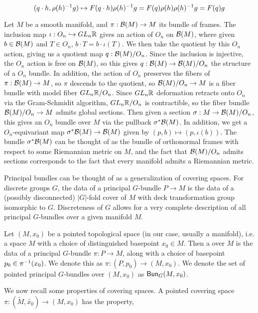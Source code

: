 \[
(q \cdot h, \rho(h)^{-1} g) \mapsto F(q \cdot h)\rho(h)^{-1} g = F(q)\rho(h)\rho(h)^{-1} g
= F(q)g
\]
%
\begin{exmp}
Let $M$ be a smooth manifold, and $\pi : \mathcal{B}(M) \to M$ its bundle of frames.
The inclusion map $\iota: O_n \hookrightarrow GL_n\mathbb{R}$ gives an action of $O_n$ on
$\mathcal{B}(M)$, where given $b \in \mathcal{B}(M)$ and $T \in O_n$, $b \cdot T = b \cdot \iota(T)$.
We then take the quotient by this $O_n$ action, giving us a quotient map
$q : \mathcal{B}(M) / O_n$. Since the inclusion is injective, the $O_n$ action
is free on $\mathcal{B}(M)$, so this gives $q : \mathcal{B}(M) \to \mathcal{B}(M) / O_n$ the structure of a
$O_n$ bundle. In addition, the action of $O_n$ preserves the fibers of
$\pi : \mathcal{B}(M) \to M$, so $\pi$ descends to the quotient, so $\mathcal{B}(M) / O_n \to M$
is a fiber bundle with model fiber $GL_n\mathbb{R} / O_n$. Since $GL_n\mathbb{R}$ deformation
retracts onto $O_n$ via the Gram-Schmidit algorithm, $GL_n\mathbb{R} / O_n$ is
contractible, so the fiber bundle $\mathcal{B}(M)/ O_n \to M$ admits global sections.
Then given a section $\sigma : M \to \mathcal{B}(M) / O_n$, this gives an $O_n$ bundle
over $M$ via the pullback $\sigma^*\mathcal{B}(M)$. In addition, we get a $O_n$-equivariant
map $\sigma^*\mathcal{B}(M) \to \mathcal{B}(M)$ given by $(p, b) \mapsto (p, \iota(b))$. The
bundle $\sigma^*\mathcal{B}(M)$ can be thought of as the bundle of orthonormal frames
with respect to some Riemannian metric on $M$, and the fact that $\mathcal{B}(M) / O_n$
admits sections corresponds to the fact that every manifold admits a Riemannian
metric.
\end{exmp}
%
Principal bundles can be thought of as a generalization of covering spaces.
For discrete groups $G$, the data of a principal $G$-bundle $P \to M$ is the
data of a (possibly disconnected) $|G|$-fold cover of $M$ with deck transformation
group isomorphic to $G$. Discreteness of $G$ allows for a very complete description
of all principal $G$-bundles over a given manifold $M$.
%
\begin{defn}
Let $(M,x_0)$ be a pointed topological space (in our case, usually a manifold),
i.e. a space $M$ with a choice of distinguished basepoint $x_0 \in M$. Then
a  over $M$ is the data of a principal $G$-bundle
$\pi : P \to M$, along with a choice of basepoint $p_0 \in \pi^{-1}(x_0)$. We
denote this as $\pi : (P,p_0) \to (M, x_0)$. We denote the set of pointed principal
$G$-bundles over $(M,x_0)$ as $\mathsf{Bun}_G(M ,x_0)$.
\end{defn}
%
We now recall some properties of covering spaces. A pointed covering space
$\pi : (\tilde{M}, \tilde{x_0}) \to (M, x_0)$ has the  property,
